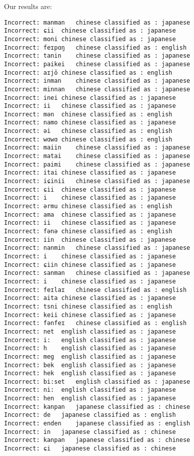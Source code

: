 \documentclass[a4paper]{article}
\begin{document}
Our results are:
\begin{verbatim}
Incorrect: manman	chinese classified as : japanese
Incorrect: ɕii	chinese classified as : japanese
Incorrect: moni	chinese classified as : japanese
Incorrect: feɪpɑŋ	chinese classified as : english
Incorrect: tanin	chinese classified as : japanese
Incorrect: paikei	chinese classified as : japanese
Incorrect: aɪjō	chinese classified as : english
Incorrect: inman	chinese classified as : japanese
Incorrect: minnan	chinese classified as : japanese
Incorrect: inei	chinese classified as : japanese
Incorrect: ii	chinese classified as : japanese
Incorrect: mən	chinese classified as : english
Incorrect: namo	chinese classified as : japanese
Incorrect: əi	chinese classified as : english
Incorrect: wɑwɑ	chinese classified as : english
Incorrect: maiin	chinese classified as : japanese
Incorrect: matai	chinese classified as : japanese
Incorrect: paimi	chinese classified as : japanese
Incorrect: itai	chinese classified as : japanese
Incorrect: iɕinii	chinese classified as : japanese
Incorrect: ɕii	chinese classified as : japanese
Incorrect: i	chinese classified as : japanese
Incorrect: ərmu	chinese classified as : english
Incorrect: ama	chinese classified as : japanese
Incorrect: ii	chinese classified as : japanese
Incorrect: fənə	chinese classified as : english
Incorrect: iin	chinese classified as : japanese
Incorrect: nanmin	chinese classified as : japanese
Incorrect: i	chinese classified as : japanese
Incorrect: ɕiin	chinese classified as : japanese
Incorrect: sanman	chinese classified as : japanese
Incorrect: i	chinese classified as : japanese
Incorrect: feɪlaɪ	chinese classified as : english
Incorrect: aita	chinese classified as : japanese
Incorrect: tsni	chinese classified as : english
Incorrect: keii	chinese classified as : japanese
Incorrect: fənfeɪ	chinese classified as : english
Incorrect: net	english classified as : japanese
Incorrect: i:	english classified as : japanese
Incorrect: h	english classified as : japanese
Incorrect: meg	english classified as : japanese
Incorrect: bek	english classified as : japanese
Incorrect: hek	english classified as : japanese
Incorrect: bi:set	english classified as : japanese
Incorrect: ni:	english classified as : japanese
Incorrect: hen	english classified as : japanese
Incorrect: kanpan	japanese classified as : chinese
Incorrect: de	japanese classified as : english
Incorrect: enden	japanese classified as : english
Incorrect: in	japanese classified as : chinese
Incorrect: kanpan	japanese classified as : chinese
Incorrect: ɕi	japanese classified as : chinese

\end{verbatim}
\end{document}
